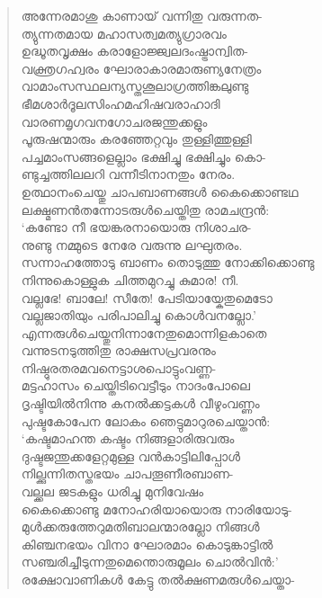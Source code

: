 \begin{verse}
അന്നേരമാശു കാണായ് വന്നിതു വരുന്നത-\\
ത്യുന്നതമായ മഹാസത്വമത്യുഗ്രാരവം\\
ഉദ്ധൂതവൃക്ഷം കരാളോജ്ജ്വലദംഷ്ട്രാന്വിത-\\
വക്ത്രഗഹ്വരം ഘോരാകാരമാരുണ്യനേത്രം\\
വാമാംസസ്ഥലന്യസ്തശൂലാഗ്രത്തിങ്കലുണ്ടു\\
ഭീമശാര്‍ദൂലസിംഹമഹിഷവരാഹാദി\\
വാരണമൃഗവനഗോചരജന്തുക്കളും\\
പൂരുഷന്മാരും കരഞ്ഞേറ്റവും തുള്ളിത്തുള്ളി\\
പച്ചമാംസങ്ങളെല്ലാം ഭക്ഷിച്ചു ഭക്ഷിച്ചും കൊ-\\
ണ്ടുച്ചത്തിലലറി വന്നീടിനാനതും നേരം.\\
ഉത്ഥാനംചെയ്തു ചാപബാണങ്ങള്‍ കൈക്കൊണ്ടഥ\\
ലക്ഷ്മണന്‍തന്നോടരുള്‍ചെയ്തിതു രാമചന്ദ്രന്‍:\\
‘കണ്ടോ നീ ഭയങ്കരനായൊരു നിശാചര-\\
നുണ്ടു നമ്മുടെ നേരേ വരുന്നു ലഘുതരം.\\
സന്നാഹത്തോടു ബാണം തൊടുത്തു \hbox{നോക്കിക്കൊണ്ടു}\\
നിന്നുകൊള്ളുക ചിത്തമുറച്ചു കുമാര! നീ.\\
വല്ലഭേ! ബാലേ! സീതേ! പേടിയായ്കേതുമെടോ\\
വല്ലജാതിയും പരിപാലിച്ചു കൊള്‍വനല്ലോ.’\\
എന്നരുള്‍ചെയ്തുനിന്നാനേതുമൊന്നിളകാതെ\\
വന്നുടനടുത്തിതു രാക്ഷസപ്രവരനും\\
നിഷ്ഠുരതരമവനെട്ടാശപൊട്ടുംവണ്ണ-\\
മട്ടഹാസം ചെയ്തിടിവെട്ടീടും നാദംപോലെ\\
ദൃഷ്ടിയില്‍നിന്നു കനല്‍ക്കട്ടകള്‍ വീഴുംവണ്ണം\\
പുഷ്ടകോപേന ലോകം ഞെട്ടുമാറുരചെയ്താന്‍:\\
‘കഷ്ടമാഹന്ത കഷ്ടം നിങ്ങളാരിരുവരും\\
ദുഷ്ടജന്തുക്കളേറ്റമുള്ള വന്‍കാട്ടിലിപ്പോള്‍\\
നില്ക്കുന്നിതസ്തഭയം ചാപതൂണീരബാണ-\\
വല്ക്കല ജടകളും ധരിച്ചു മുനിവേഷം\\
കൈക്കൊണ്ടു മനോഹരിയായൊരു നാരിയോടു-\\
മുള്‍ക്കരുത്തേറുമതിബാലന്മാരല്ലോ നിങ്ങള്‍\\
കിഞ്ചനഭയം വിനാ ഘോരമാം കൊടുങ്കാട്ടില്‍\\
സഞ്ചരിച്ചീടുന്നതുമെന്തൊരുമൂലം ചൊല്‍വിന്‍:’\\
രക്ഷോവാണികള്‍ കേട്ടു തല്‍ക്ഷണമരുള്‍ചെയ്താ-\\

\end{verse}
